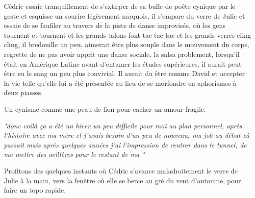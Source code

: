 \setlength{\columnsep}{4em}
\begin{paracol}{2}
Cédric essaie tranquillement de s'extirper de sa bulle de poête cynique par
le geste et esquisse un sourire légèrement narquois, il s'empare du verre
de Julie et essaie de se faufiler au travers de la piste de danse improvisée,
où les gens tournent et tournent et les grands talons font tac-tac-tac et
les grands verres cling cling, il bredouille un peu,
aimerait être plus souple dans le mouvement du corps, regrette de ne pas 
avoir apprit une danse sociale, la salsa problement, lorsqu'il était en Amérique
Latine avant d'entamer les études supérieures, il aurait peut-être eu le sang
un peu plus convivial. Il aurait du être comme David et accepter la vie telle qu'elle
lui a été présentée au lieu de se morfondre en aphorismes à deux piasses. 

Un cynisme comme une peau de lion pour cacher un amour fragile.
\switchcolumn

\textit{"\textelp{}donc voilà ça a été un hiver un peu difficile pour moi au plan 
personnel, après l'histoire avec ma mère et j'avais besoin d'un peu de nouveau,
ma job au début cà passait mais après quelques années j'ai l'impression de rentrer
dans le tunnel, de me mettre des oeillères pour le restant de ma \textelp{}"} 
\end{paracol}
\newpage
Profitons des quelques instants où Cédric s'avance maladroitement
le verre de Julie à la main, vers la fenêtre où elle se berce au gré
du vent d'automne, pour faire un topo rapide.
\setlength{\columnsep}{4em}
